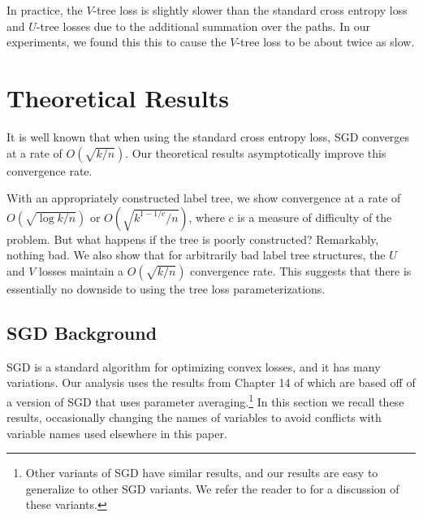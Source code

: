 \documentclass[twoside]{article}
\newcommand{\fixme}[1]{}
\begin{document}
In practice, the $V$-tree loss is slightly slower than the standard cross entropy loss and $U$-tree losses due to the additional summation over the paths.
In our experiments, we found this this to cause the $V$-tree loss to be about twice as slow.


\section{Theoretical Results}
\label{sec:theory}

It is well known that when using the standard cross entropy loss,
SGD converges at a rate of $O(\sqrt{k/n})$.
Our theoretical results asymptotically improve this convergence rate.

With an appropriately constructed label tree,
we show convergence at a rate of $O(\sqrt{\log k/n})$ or $O(\sqrt{k^{1-1/c}/n})$,
where $c$ is a measure of difficulty of the problem.
But what happens if the tree is poorly constructed?
Remarkably, nothing bad.
We also show that for arbitrarily bad label tree structures,
the $U$ and $V$ losses maintain a $O(\sqrt{k/n})$ convergence rate.
This suggests that there is essentially no downside to using the tree loss parameterizations.

\fixme{
Our analysis relies on simple properties of stochastic gradient descent,
and we view the simplicity of our analysis as a major strength of the tree loss.
In this section, we first review standard results of stochastic gradient descent needed for our analysis.
Then we formally state and prove our main result.
}

\subsection{SGD Background}

SGD is a standard algorithm for optimizing convex losses,
and it has many variations.
Our analysis uses the results from Chapter 14 of \citet{shalev2014understanding} which are based off of a version of SGD that uses parameter averaging.\footnote{
Other variants of SGD have similar results,
and our results are easy to generalize to other SGD variants.
We refer the reader to \citet{shalev2014understanding} for a discussion of these variants.}
In this section we recall these results,
occasionally changing the names of variables to avoid conflicts with variable names used elsewhere in this paper.
\end{document}

